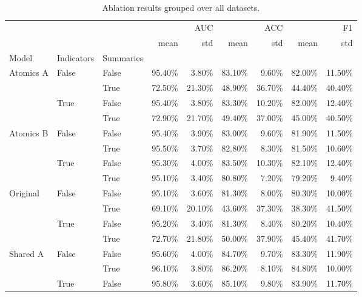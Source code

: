 \begin{table}[h]
\caption{Ablation results grouped over all datasets.}
\label{ablation_grouped}
\begin{tabular}{lllrrrrrr}
\toprule
 &  &  & \multicolumn{2}{r}{AUC} & \multicolumn{2}{r}{ACC} & \multicolumn{2}{r}{F1} \\
 &  &  & mean & std & mean & std & mean & std \\
Model & Indicators & Summaries &  &  &  &  &  &  \\
\midrule
\multirow[t]{4}{*}{Atomics A} & \multirow[t]{2}{*}{False} & False & 95.40\% & 3.80\% & 83.10\% & 9.60\% & 82.00\% & 11.50\% \\
 &  & True & 72.50\% & 21.30\% & 48.90\% & 36.70\% & 44.40\% & 40.40\% \\
\cline{2-9}
 & \multirow[t]{2}{*}{True} & False & 95.40\% & 3.80\% & 83.30\% & 10.20\% & 82.00\% & 12.40\% \\
 &  & True & 72.90\% & 21.70\% & 49.40\% & 37.00\% & 45.00\% & 40.50\% \\
\cline{1-9} \cline{2-9}
\multirow[t]{4}{*}{Atomics B} & \multirow[t]{2}{*}{False} & False & 95.40\% & 3.90\% & 83.00\% & 9.60\% & 81.90\% & 11.50\% \\
 &  & True & 95.50\% & 3.70\% & 82.80\% & 8.30\% & 81.50\% & 10.60\% \\
\cline{2-9}
 & \multirow[t]{2}{*}{True} & False & 95.30\% & 4.00\% & 83.50\% & 10.30\% & 82.10\% & 12.40\% \\
 &  & True & 95.10\% & 3.40\% & 80.80\% & 7.20\% & 79.20\% & 9.40\% \\
\cline{1-9} \cline{2-9}
\multirow[t]{4}{*}{Original} & \multirow[t]{2}{*}{False} & False & 95.10\% & 3.60\% & 81.30\% & 8.00\% & 80.30\% & 10.00\% \\
 &  & True & 69.10\% & 20.10\% & 43.60\% & 37.30\% & 38.30\% & 41.50\% \\
\cline{2-9}
 & \multirow[t]{2}{*}{True} & False & 95.20\% & 3.40\% & 81.30\% & 8.40\% & 80.20\% & 10.40\% \\
 &  & True & 72.70\% & 21.80\% & 50.00\% & 37.90\% & 45.40\% & 41.70\% \\
\cline{1-9} \cline{2-9}
\multirow[t]{4}{*}{Shared A} & \multirow[t]{2}{*}{False} & False & 95.60\% & 4.00\% & 84.70\% & 9.70\% & 83.30\% & 11.90\% \\
 &  & True & 96.10\% & 3.80\% & 86.20\% & 8.10\% & 84.80\% & 10.00\% \\
\cline{2-9}
 & \multirow[t]{2}{*}{True} & False & 95.80\% & 3.60\% & 85.10\% & 9.80\% & 83.90\% & 11.70\% \\

\end{tabular}
\end{table}
